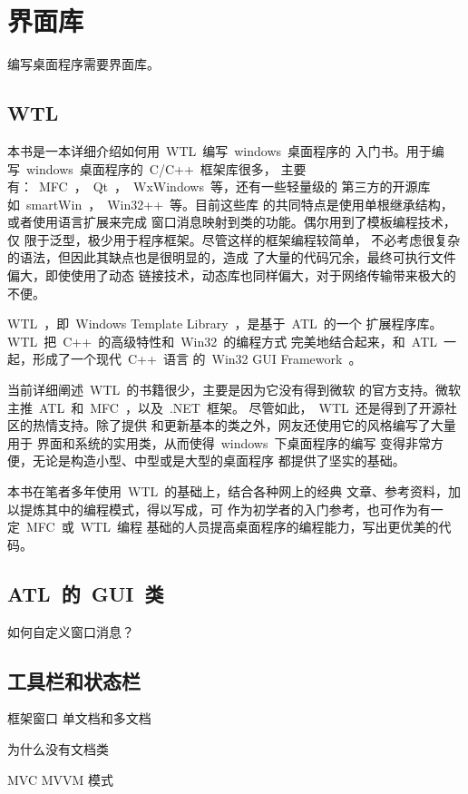 ﻿%
%

\chapter{界面库}

编写桌面程序需要界面库。

\section{WTL}

本书是一本详细介绍如何用~WTL~编写~windows~桌面程序的
入门书。用于编写~windows~桌面程序的~C/C++~框架库很多，
主要有：~MFC~，~Qt~，~WxWindows~等，还有一些轻量级的
第三方的开源库如~smartWin~，~Win32++~等。目前这些库
的共同特点是使用单根继承结构，或者使用语言扩展来完成
窗口消息映射到类的功能。偶尔用到了模板编程技术，仅
限于泛型，极少用于程序框架。尽管这样的框架编程较简单，
不必考虑很复杂的语法，但因此其缺点也是很明显的，造成
了大量的代码冗余，最终可执行文件偏大，即使使用了动态
链接技术，动态库也同样偏大，对于网络传输带来极大的
不便。

WTL~，即~Windows Template Library~，是基于~ATL~的一个
扩展程序库。WTL~把~C++~的高级特性和~Win32~的编程方式
完美地结合起来，和~ATL~一起，形成了一个现代~C++~语言
的~Win32 GUI Framework~。

当前详细阐述~WTL~的书籍很少，主要是因为它没有得到微软
的官方支持。微软主推~ATL~和~MFC~，以及~.NET~框架。
尽管如此，~WTL~还是得到了开源社区的热情支持。除了提供
和更新基本的类之外，网友还使用它的风格编写了大量用于
界面和系统的实用类，从而使得~windows~下桌面程序的编写
变得非常方便，无论是构造小型、中型或是大型的桌面程序
都提供了坚实的基础。

本书在笔者多年使用~WTL~的基础上，结合各种网上的经典
文章、参考资料，加以提炼其中的编程模式，得以写成，可
作为初学者的入门参考，也可作为有一定~MFC~或~WTL~编程
基础的人员提高桌面程序的编程能力，写出更优美的代码。

\section{ATL~的~GUI~类}


如何自定义窗口消息？

\section{工具栏和状态栏}

框架窗口
单文档和多文档

为什么没有文档类

MVC MVVM 模式




